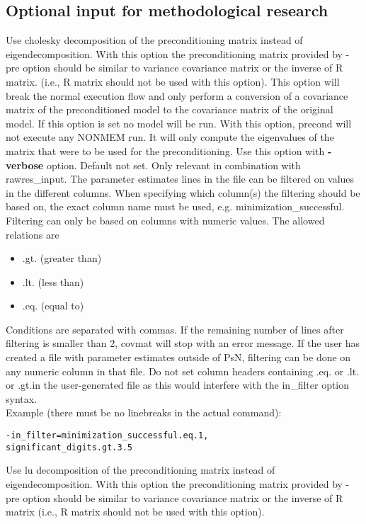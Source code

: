 \subsection{Optional input for methodological research}

\begin{optionlist}
Use cholesky decomposition of the preconditioning matrix instead of eigendecomposition. With this option the preconditioning matrix provided by -pre option should be similar to variance covariance matrix or the inverse of R matrix. (i.e., R matrix should not be used with this option).
\nextopt
{}
This option will break the normal execution flow and only perform a conversion of a covariance matrix of the preconditioned model to the covariance matrix of the original model. If this option is set no model will be run.
\nextopt
{}
With this option, precond will not execute any NONMEM run.  It will only compute the eigenvalues of the matrix that were to be used for the preconditioning.  Use this option with {\bf-verbose} option.
\nextopt
{}
Default not set. Only relevant in combination with rawres\_input. The parameter estimates lines in the file can be filtered on values in the different columns. When specifying which column(s) the filtering should be based on, the exact column name must be used, e.g. minimization\_successful. Filtering can only be based on columns with numeric values.
The allowed relations are
\begin{itemize} 
	\item .gt. (greater than)
	\item .lt. (less than)
	\item .eq. (equal to) 
\end{itemize}
Conditions are separated with commas. If the remaining number of lines after filtering is smaller than 2, covmat will stop with an error message. If the user has created a file with parameter estimates outside of PsN, filtering can be done on any numeric column in that file. Do not set column headers containing .eq. or .lt. or .gt.in the user-generated file as this would interfere with the in\_filter option syntax.\\
Example (there must be no linebreaks in the actual command):
\begin{verbatim}
-in_filter=minimization_successful.eq.1,
significant_digits.gt.3.5
\end{verbatim}
\nextopt	
{}
Use lu decomposition of the preconditioning matrix instead of eigendecomposition. With this option the preconditioning matrix provided by -pre option should be similar to variance covariance matrix or the inverse of R matrix (i.e., R matrix should not be used with this option).

\end{optionlist}
